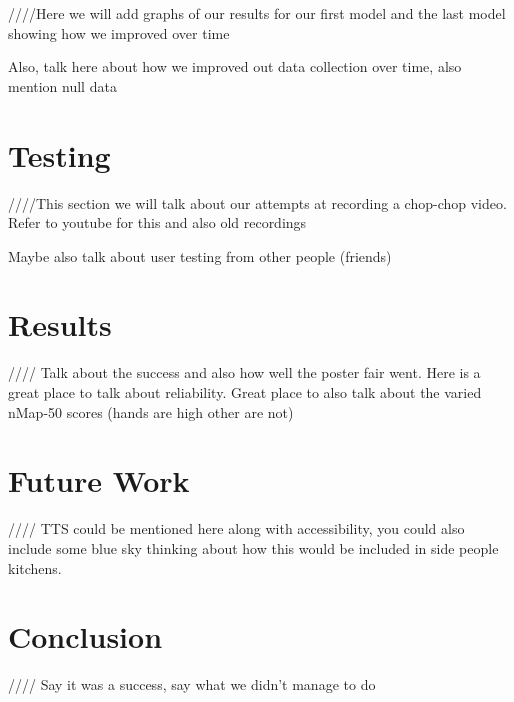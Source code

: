 \documentclass{article}
\begin{document}
    ////Here we will add graphs of our results for our first model and the last model showing how we improved over time

    Also, talk here about how we improved out data collection over time, also mention null data


    \section{Testing}
    ////This section we will talk about our attempts at recording a chop-chop video. Refer to youtube for this and also old recordings

    Maybe also talk about user testing from other people (friends)

    \section{Results}
    //// Talk about the success and also how well the poster fair went. Here is a great place to talk about reliability. Great place to also talk about the varied nMap-50 scores (hands are high other are not)

    \section{Future Work}
    //// TTS could be mentioned here along with accessibility, you could also include some blue sky thinking about how this would be included in side people kitchens.


    \section{Conclusion}
    //// Say it was a success, say what we didn't manage to do

    \pagebreak

    
  

  
  
  
\end{document}
